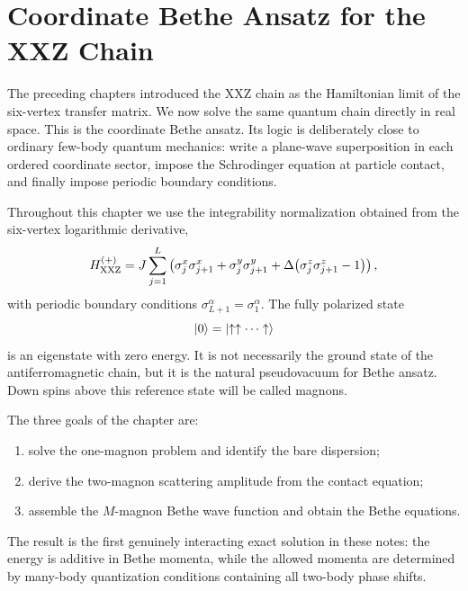 \chapter{Coordinate Bethe Ansatz for the XXZ Chain}
\label{chap:coordinate-bethe-ansatz-xxz}

The preceding chapters introduced the XXZ chain as the Hamiltonian limit of the
six-vertex transfer matrix.  We now solve the same quantum chain directly in real
space.  This is the coordinate Bethe ansatz.  Its logic is deliberately close to
ordinary few-body quantum mechanics: write a plane-wave superposition in each
ordered coordinate sector, impose the Schrodinger equation at particle contact,
and finally impose periodic boundary conditions.

Throughout this chapter we use the integrability normalization obtained from the
six-vertex logarithmic derivative,
\begin{equation}
\label{eq:cba-xxz-hamiltonian}
    H_{\rm XXZ}^{(+)}
    =
    J\sum_{j=1}^{L}
    \left(
        \sigma_j^x\sigma_{j+1}^x
        +\sigma_j^y\sigma_{j+1}^y
        +\Delta\bigl(\sigma_j^z\sigma_{j+1}^z-1\bigr)
    \right),
\end{equation}
with periodic boundary conditions $\sigma_{L+1}^\alpha=\sigma_1^\alpha$.  The
fully polarized state
\begin{equation}
\label{eq:cba-ferromagnetic-reference}
    \left|0\right\rangle=\left|\uparrow\uparrow\cdots\uparrow\right\rangle
\end{equation}
is an eigenstate with zero energy.  It is not necessarily the ground state of the
antiferromagnetic chain, but it is the natural pseudovacuum for Bethe ansatz.
Down spins above this reference state will be called magnons.

The three goals of the chapter are:
\begin{enumerate}[label=(\roman*)]
    \item solve the one-magnon problem and identify the bare dispersion;
    \item derive the two-magnon scattering amplitude from the contact equation;
    \item assemble the $M$-magnon Bethe wave function and obtain the Bethe
    equations.
\end{enumerate}
The result is the first genuinely interacting exact solution in these notes: the
energy is additive in Bethe momenta, while the allowed momenta are determined by
many-body quantization conditions containing all two-body phase shifts.

